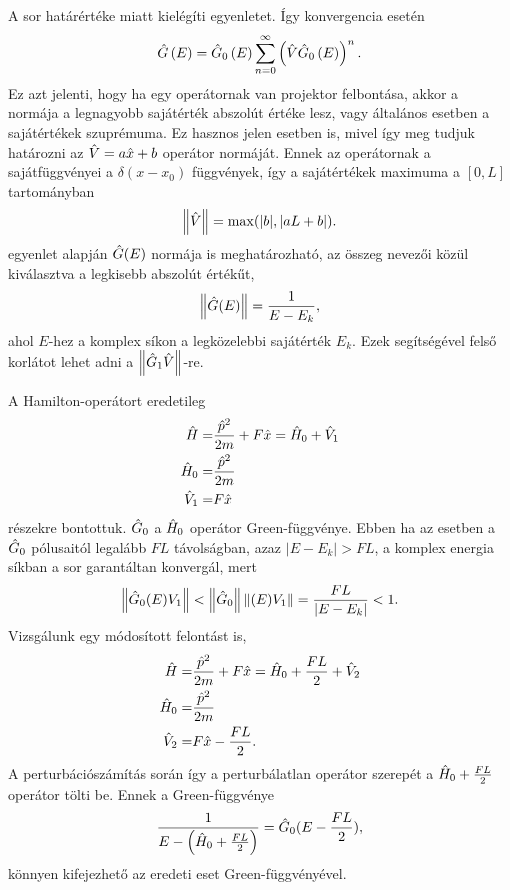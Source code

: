 A sor határértéke  miatt kielégíti  egyenletet. Így konvergencia esetén
\begin{equation}
	\hat{G}\left(E\right) = \hat{G}_0\left(E\right)\sum_{n=0}^\infty\left(\hat{V}\hat{G}_0\left(E\right)\right)^n.
\end{equation}
Ez azt jelenti, hogy ha egy operátornak van projektor felbontása, akkor a normája a legnagyobb sajátérték abszolút értéke lesz, vagy általános esetben a sajátértékek szuprémuma. Ez hasznos jelen esetben is, mivel így meg tudjuk határozni az $\hat{V}=a\hat{x}+b$ operátor normáját. Ennek az operátornak a sajátfüggvényei a $\delta(x-x_0)$ függvények, így a sajátértékek maximuma a $[0,L]$ tartományban
\begin{equation}
	\left\lVert \hat{V} \right\rVert=\max(\rvert b \lvert, \lvert aL+b\rvert).
\end{equation}
 egyenlet alapján $\hat{G}(E)$ normája is meghatározható, az összeg nevezői közül kiválasztva a legkisebb abszolút értékűt,
\begin{equation}
	\left\lVert \hat{G}(E) \right\rVert=\frac{1}{E-E_k},
\end{equation}
ahol $E$-hez a komplex síkon a legközelebbi sajátérték $E_k$. Ezek segítségével felső korlátot lehet adni a $\left\lVert \hat{G}_1\hat{V} \right\rVert$-re.

A Hamilton-operátort eredetileg
\begin{equation}
	\begin{aligned}
		\hat{H}=&\frac{\hat{p}^2}{2m}+F\hat{x}=\hat{H}_0+\hat{V}_1\\
		\hat{H}_0=&\frac{\hat{p}^2}{2m}\\
		\hat{V}_1=&F\hat{x}
	\end{aligned}
\end{equation}
részekre bontottuk. $\hat{G}_0$ a $\hat{H}_0$ operátor Green-függvénye. Ebben ha az esetben a $\hat{G}_0$ pólusaitól legalább $FL$ távolságban, azaz $\rvert E-E_k\lvert>FL$, a komplex energia síkban a sor garantáltan konvergál, mert
\begin{equation}
	\left\lVert \hat{G}_0(E)V_1 \right\rVert<\left\lVert \hat{G}_0 \right\rVert\left\lVert (E)V_1 \right\rVert=\frac{FL}{\rvert E-E_k\lvert}<1.
\end{equation}
Vizsgálunk egy módosított felontást is,
\begin{equation}
	\begin{aligned}
		\hat{H}=&\frac{\hat{p}^2}{2m}+F\hat{x}=\hat{H}_0+\frac{FL}{2}+\hat{V}_2\\
		\hat{H}_0=&\frac{\hat{p}^2}{2m}\\
		\hat{V}_2=&F\hat{x}-\frac{FL}{2}.
	\end{aligned}
\end{equation}
A perturbációszámítás során így a perturbálatlan operátor szerepét a $\hat{H}_0+\frac{FL}{2}$ operátor tölti be. Ennek a Green-függvénye
\begin{equation}
	\frac{1}{E-\left(\hat{H}_0+\frac{FL}{2}\right)}=\hat{G}_0(E-\frac{FL}{2}),
\end{equation}
könnyen kifejezhető az eredeti eset Green-függvényével.

